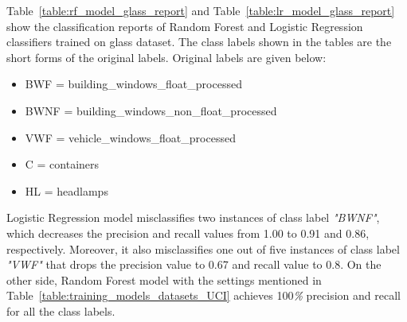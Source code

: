\documentclass[english]{tktltiki2}
\theoremstyle{definition}
\theoremstyle{remark}
\begin{document}
Table~\ref{table:rf_model_glass_report} and Table~\ref{table:lr_model_glass_report} show the classification reports of Random Forest and Logistic Regression classifiers trained on glass dataset. The class labels shown in the tables are the short forms of the original labels. Original labels are given below:
\begin{itemize}
	\item BWF = building\_windows\_float\_processed
	\item BWNF = building\_windows\_non\_float\_processed
	\item VWF = vehicle\_windows\_float\_processed
	\item C = containers
	\item HL = headlamps
\end{itemize}

Logistic Regression model misclassifies two instances of class label \textit{"BWNF"}, which decreases the precision and recall values from 1.00 to 0.91 and 0.86, respectively. Moreover, it also misclassifies one out of five instances of class label \textit{"VWF"} that drops the precision value to 0.67 and recall value to 0.8. On the other side, Random Forest model with the settings mentioned in Table~\ref{table:training_models_datasets_UCI} achieves 100\textit{\%} precision and recall for all the class labels. 
\end{document}
